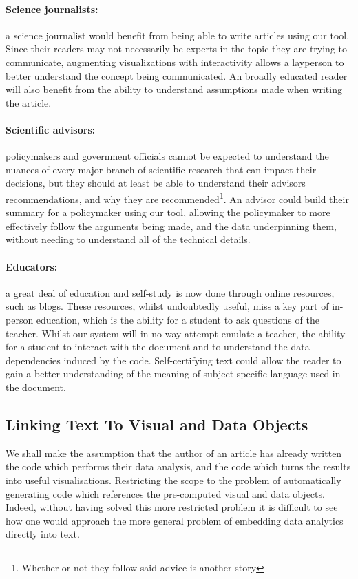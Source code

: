 \paragraph{Science journalists:} a science journalist would benefit from being able to write articles using our tool.
Since their readers may not necessarily be experts in the topic they are trying to communicate, augmenting visualizations
with interactivity allows a layperson to better understand the concept being communicated. An broadly educated reader
will also benefit from the ability to understand assumptions made when writing the article.

\paragraph{Scientific advisors:} policymakers and government officials cannot be expected to understand the nuances of
every major branch of scientific research that can impact their decisions, but they should at least be able to
understand their advisors recommendations, and why they are recommended\footnote{Whether or not they follow said advice is another story}.
An advisor could build their summary for a policymaker using our tool, allowing the policymaker to more effectively
follow the arguments being made, and the data underpinning them, without needing to understand all of the technical details. 

\paragraph{Educators:} a great deal of education and self-study is now done through online resources, such as blogs.
These resources, whilst undoubtedly useful, miss a key part of in-person education, which is the ability for a student
to ask questions of the teacher. Whilst our system will in no way attempt emulate a teacher, the ability for a student
to interact with the document and to understand the data dependencies induced by the code. Self-certifying text could
allow the reader to gain a better understanding of the meaning of subject specific language used in the document. 


\subsection{Linking Text To Visual and Data Objects}
We shall make the assumption that the author of an article has already written the code which performs
their data analysis, and the code which turns the results into useful visualisations. Restricting the scope to the problem of
automatically generating code which references the pre-computed visual and data objects.
Indeed, without having solved this more restricted problem it is difficult to see how one would approach
the more general problem of embedding data analytics directly into text.

